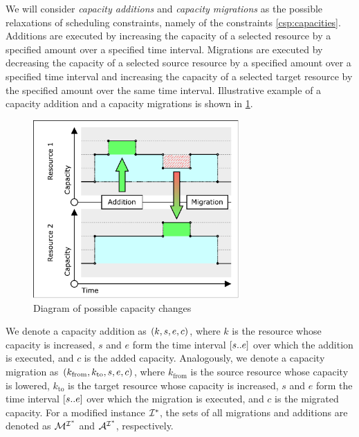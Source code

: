 We will consider \emph{capacity additions} and \emph{capacity migrations} as the possible relaxations
of scheduling constraints, namely of the constraints \eqref{csp:capacities}.
Additions are executed by increasing the capacity of a selected resource
by a specified amount over a specified time interval.
Migrations are executed by decreasing the capacity of a selected source resource
by a specified amount over a specified time interval
and increasing the capacity of a selected target resource
by the specified amount over the same time interval.
Illustrative example of a capacity addition and a capacity migrations is shown in \cref{fig:CapacityChanges}.

\begin{figure}
    \centering
    \includegraphics[width=0.7\textwidth]{img/Capacities-Changes.pdf}
    \caption{Diagram of possible capacity changes}
    \label{fig:CapacityChanges}
\end{figure}

We denote a capacity addition as $(k, s, e, c)$, where
$k$ is the resource whose capacity is increased,
$s$ and $e$ form the time interval $[{s}..{e}]$ over which the addition is executed, and
$c$ is the added capacity.
Analogously, we denote a capacity migration as $(k_{\text{from}}, k_{\text{to}}, s, e, c)$, where
$k_{\text{from}}$ is the source resource whose capacity is lowered,
$k_{\text{to}}$ is the target resource whose capacity is increased,
$s$ and $e$ form the time interval $[{s}..{e}]$ over which the migration is executed, and
$c$ is the migrated capacity.
For a modified instance $\mathcal{I}^*$, the sets of all migrations and additions are denoted as
$\mathcal{M}^{\mathcal{I}^*}$ and $\mathcal{A}^{\mathcal{I}^*}$, respectively.


